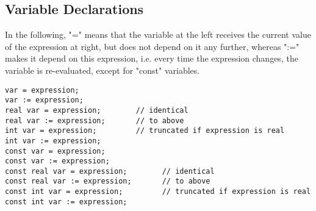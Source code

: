 
\subsection{Variable Declarations}
\label{subsec:var_declarations}

In the following, "=" means that the variable at the left receives the
current value of the expression at right, but does not depend on it any
further, whereas ":=" makes it depend on this expression, i.e. every
time the expression changes, the variable is re-evaluated, except for
"const" variables.  

\begin{verbatim}
var = expression;
var := expression;
real var = expression;        // identical
real var := expression;       // to above
int var = expression;         // truncated if expression is real
int var := expression;
const var = expression;
const var := expression;
const real var = expression;        // identical
const real var := expression;       // to above
const int var = expression;         // truncated if expression is real
const int var := expression;
\end{verbatim}


